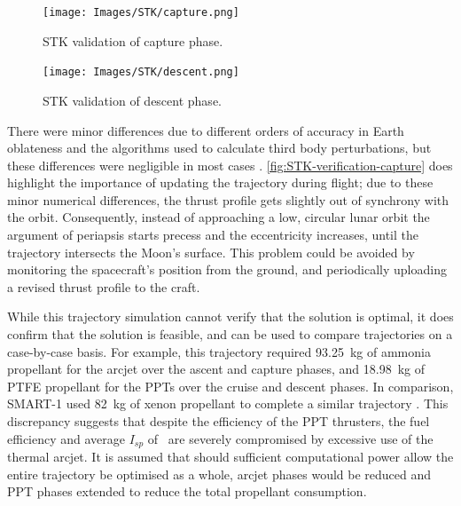 \begin{figure}
\centering
\texttt{[image: Images/STK/capture.png]}
\caption{STK validation of capture phase.} \label{fig:STK-verification-capture}
\end{figure}


\begin{figure}
\centering
\texttt{[image: Images/STK/descent.png]}
\caption{STK validation of descent phase.} \label{fig:STK-verification-descent}
\end{figure}

There were minor differences %
due to different orders of accuracy in Earth oblateness and the algorithms used to calculate third body perturbations, but these differences were negligible in most cases%
. \autoref{fig:STK-verification-capture} does highlight the importance of updating the trajectory during flight; due to these minor numerical differences, the thrust profile gets slightly out of synchrony with the orbit. Consequently, instead of approaching a low, circular lunar orbit the argument of periapsis starts precess and the eccentricity increases, until the trajectory intersects the Moon's surface. This problem could be avoided by monitoring the spacecraft's position from the ground, and periodically uploading a revised thrust profile to the craft.

%

While this trajectory simulation cannot verify that the solution is optimal, it does confirm that the solution is feasible, and can be used to compare trajectories on a case-by-case basis. For example, this trajectory required 93.25~kg of ammonia propellant for the arcjet over the ascent and capture phases, and 18.98~kg of PTFE propellant for the PPTs over the cruise and descent phases. In comparison, SMART-1 used 82~kg of xenon propellant to complete a similar trajectory \parencite{Estublier2007}. This discrepancy suggests that despite the efficiency of the PPT thrusters, the fuel efficiency and average $I_{sp}$ of \BW\ are severely compromised by excessive use of the thermal arcjet. It is assumed that should sufficient computational power allow the entire trajectory be optimised as a whole, arcjet phases would be reduced and PPT phases extended to reduce the total propellant consumption.


